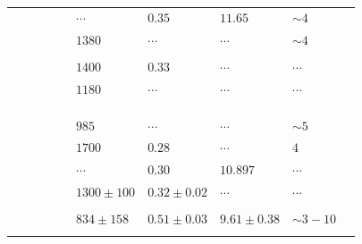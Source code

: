 \documentclass[fleqn,usenatbib,usedcolumn,useAMS]{mnras}
\begin{document}
\begin{table}
{\begin{tabular}{@{}llllllllll@{}}
			\citet{1989MNRAS.236..263P}                                     &  &  &  &  & $\cdots$     & $0.35$        & $11.65$        & $\sim 4$  &  \\
			\citet{1991MNRAS.249...76B}                                     &  &  &  &  & $1380$       & $\cdots$      & $\cdots$       & $\sim 4$  &  \\
			\citet{1993Obs...113..204S}                                     &  &  &  &  &              &               &                &           &  \\
			\citet{1994RMxAA..29..141F}                                     &  &  &  &  & $1400$       & $0.33$        & $\cdots$       & $\cdots$  &  \\
			\citet{1999AstL...25..595R}                                     &  &  &  &  & $1180$       & $\cdots$      & $\cdots$       & $\cdots$  &  \\
			\citet{2000AA...362..580V}                                     &  &  &  &  &              &               &                &           &  \\
			\citet{2003AA...407..925R}                                     &  &  &  &  &              &               &                &           &  \\
			\citet{zwintz_marconi_kallinger_weiss_2004,2005MNRAS.357..345Z} &  &  &  &  &              &               &                &           &  \\
			\citet{2005AA...438.1163K}                                      &  &  &  &  & $985$        & $\cdots$      & $\cdots$       & $\sim 5$  &  \\
			\citet{2007AA...462..157P}                                      &  &  &  &  & $1700$       & $0.28$        & $\cdots$       & $4$       &  \\
			\citet{2008AA...477..165P}                                      &  &  &  &  & $\cdots$     & $0.30$        & $10.897$       & $\cdots$  &  \\
			\citet{2008hsf2.book..497R}                                     &  &  &  &  & $1300\pm100$ & $0.32\pm0.02$ & $\cdots$       & $\cdots$  &  \\
			\citet{2010AA...511A..25R}                                     &  &  &  &  &              &               &                &           &  \\
			\citet{2018AA...610A..30A}  &                   &             &              &          & $834\pm158$  & $0.51\pm0.03$ & $9.61\pm0.38$                 & $\sim3-10$  &  \\
			\citet{2019MNRAS.484.5102K}                                     &  &  &  &  &              &               &                &           &  \\ \bottomrule
		\end{tabular}%
	}
	\caption{}
	\label{tab:results}
\end{table}
\end{document}
